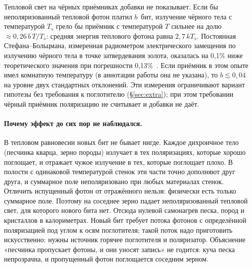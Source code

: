 \documentclass[11pt,a4paper]{article}
\newcommand{\Sref}[1]{\hyperref[#1]{\S\ref{#1}}}
\begin{document}
Тепловой свет на чёрных приёмниках добавки не показывает. Если бы неполяризованный тепловой фотон платил $b$~бит, излучение чёрного тела с температурой $T_s$ грело бы приёмник с температурой $T$ сильнее на долю $\approx 0{,}26\,b\,T/T_s$: средняя энергия теплового фотона равна $2{,}7\,kT_s$. Постоянная Стефана--Больцмана, измеренная радиометром электрического замещения по излучению чёрного тела в точке затвердевания золота, оказалась на 0,1\% ниже теоретического значения при погрешности 0,13\%~\cite{blevin1971}. Если приёмник в этом опыте имел комнатную температуру (в аннотации работы она не указана), то $b\lesssim 0{,}04$ на уровне двух стандартных отклонений. Эти измерения ограничивают вариант гипотезы без требования к поглотителю (\Sref{sec:extra}); при этом требовании чёрный приёмник поляризацию не считывает и добавки не даёт.

\paragraph{Почему эффект до сих пор не наблюдался.}
В тепловом равновесии новых бит не бывает нигде. Каждое дихроичное тело (песчинка кварца, зерно породы) излучает в тех поляризациях, которые хорошо поглощает, и отражает чужое излучение в тех, которые поглощает плохо. В полости с одинаковой температурой стенок эти части точно дополняют друг друга, и суммарное поле неполяризовано при любых материалах стенок. Отличить испущенный фотон от отражённого нельзя: физически есть только суммарное поле. Поэтому на соседнее зерно падает неполяризованный тепловой свет, для которого нового бита нет. Отсюда нулевой самонагрев песка, пород и кристаллов в калориметрах. Новый бит требует потока фотонов с определённой поляризацией под углом к осям поглотителя; такой поток надо приготовить искусственно: нужны источник горячее поглотителя и поляризатор. Объяснение «песчинка пропускает фотоны, и они уносят запись» не годится: куча песка непрозрачна, и пропущенный фотон поглощается соседним зерном.
\end{document}
